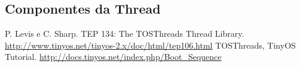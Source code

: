 \documentclass[a4paper,onecolumn, 10pt]{article}
\begin{document}
\subsection{Componentes da Thread}


\pagebreak

\begin{thebibliography}{9}
 P. Levis e C. Sharp. TEP 134: The TOSThreads Thread Library.
                    \url{http://www.tinyos.net/tinyos-2.x/doc/html/tep106.html}
 TOSThreads, TinyOS Tutorial. \url{http://docs.tinyos.net/index.php/Boot_Sequence}
\end{thebibliography}
\end{document}
